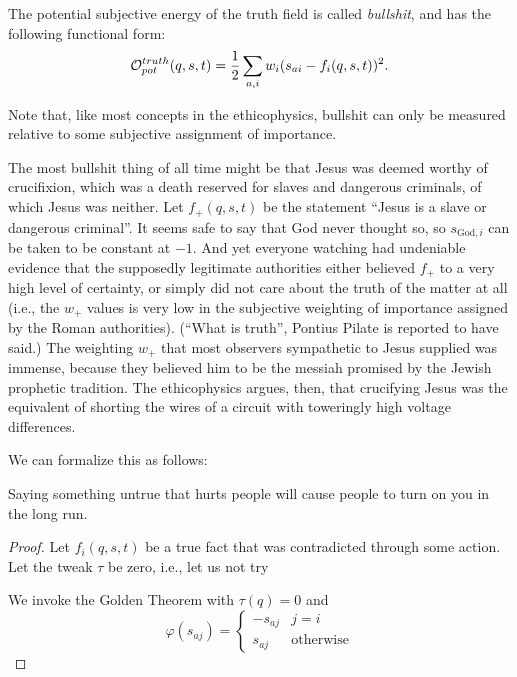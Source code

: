 \documentclass{article}
\begin{document}
The potential subjective energy of the truth field is called
{\em bullshit}, and has the following functional form:
$${\mathcal O}_{pot}^{truth}(q, s, t) = \frac{1}{2} \sum_{a, i} w_i (s_{ai} -
f_i(q, s, t))^2.$$

Note that, like most concepts in the ethicophysics, bullshit can only
be measured relative to some subjective assignment of importance.

The most bullshit thing of all time might be that Jesus was deemed
worthy of crucifixion, which was a death reserved for slaves and
dangerous criminals, of which Jesus was neither. Let $f_+(q, s, t)$ be
the statement ``Jesus is a slave or dangerous criminal''. It seems
safe to say that God never thought so, so $s_{\mathrm{God}, i}$ can be
taken to be constant at $-1$. And yet everyone watching had undeniable
evidence that the supposedly legitimate authorities either believed
$f_+$ to a very high level of certainty, or simply did not care about
the truth of the matter at all (i.e., the $w_+$ values is very low in
the subjective weighting of importance assigned by the Roman
authorities). (``What is truth'', Pontius Pilate is reported to have
said.) The weighting $w_+$ that most observers sympathetic to Jesus
supplied was immense, because they believed him to be the messiah
promised by the Jewish prophetic tradition. The ethicophysics argues,
then, that crucifying Jesus was the equivalent of shorting the wires
of a circuit with toweringly high voltage differences.

We can formalize this as follows:
\begin{thm}
  Saying something untrue that hurts people will cause people to turn
  on you in the long run.
\end{thm}
\begin{proof}
  Let $f_i(q, s, t)$ be a true fact that was contradicted through some
  action. Let the tweak $\tau$ be zero, i.e., let us not try 
  
  We invoke the Golden Theorem with $\tau(q) = 0$ and
  $$\varphi(s_{aj}) = \begin{cases} -s_{aj} & j = i \\ s_{aj} &
    \mbox{otherwise} \end{cases}$$
\end{proof}

 
\end{document}
